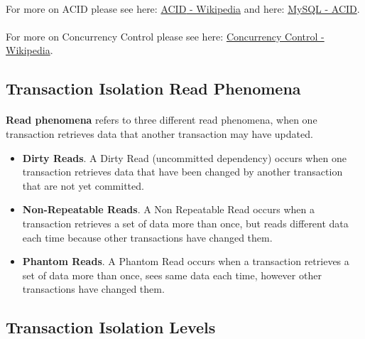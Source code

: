 \paragraph{} For more on \acs{ACID} please see here: \href{https://en.wikipedia.org/wiki/ACID}{\acs{ACID} - Wikipedia} and here: \href{https://dev.mysql.com/doc/refman/8.0/en/mysql-acid.html}{MySQL - ACID}.
\paragraph{} For more on Concurrency Control please see here: \href{https://en.wikipedia.org/wiki/Concurrency_control}{Concurrency Control - Wikipedia}.
\subsection{Transaction Isolation Read Phenomena}
\paragraph{} \textbf{Read phenomena} refers to three different read phenomena, when one transaction retrieves data that another transaction may have updated.
\begin{itemize}
	\item \textbf{Dirty Reads}. A Dirty Read (uncommitted dependency) occurs when one transaction retrieves data that have been changed by another transaction that are not yet committed.
	\item \textbf{Non-Repeatable Reads}.  A Non Repeatable Read occurs when a transaction retrieves a set of data more than once, but reads different data each time because other transactions have changed them.
	\item \textbf{Phantom Reads}. A Phantom Read occurs when a transaction retrieves a set of data more than once, sees same data each time, however other transactions have changed them.
\end{itemize}
\subsection{Transaction Isolation Levels}
